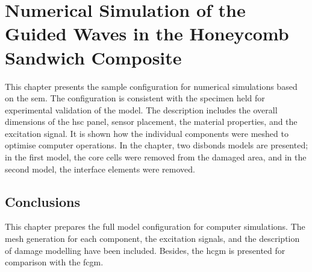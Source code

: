 
\chapter[Numerical Simulation of the \acs{gw} in the \acs{hsc}]{Numerical Simulation of the Guided Waves in the Honeycomb Sandwich Composite}
\label{ch:simulation}

This chapter presents the sample configuration for numerical simulations based on the \ac{sem}.
The configuration is consistent with the specimen held for experimental validation of the model.
The description includes the overall dimensions of the \ac{hsc} panel, sensor placement, the material properties, and the excitation signal.
It is shown how the individual components were meshed to optimise computer operations.
In the chapter, two disbonds models are presented; in the first model, the core cells were removed from the damaged area, and in the second model, the interface elements were removed.






%

\section{Conclusions}
\label{sec:conclusionsSimul}

This chapter prepares the full model configuration for computer simulations.
The mesh generation for each component, the excitation signals, and the description of damage modelling have been included.
Besides, the \ac{hcgm} is presented for comparison with the \ac{fcgm}.